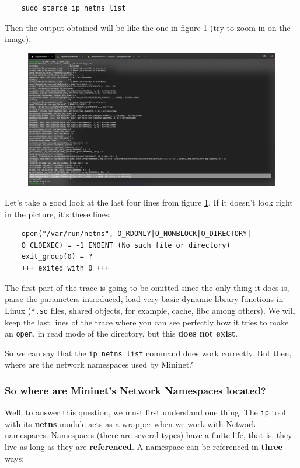 \documentclass[12pt]{article}
\newcommand{\newpar} {
    \vskip 1cm
}
\begin{document}
			\begin{verbatim}
	sudo starce ip netns list
			\end{verbatim}

			Then the output obtained will be like the one in figure \ref{f:sys_trace} (try to zoom in on the image).

			\begin{figure}[!htb]
				\centering
				\includegraphics[width=\linewidth]{sys_trace.jpg}
				\label{f:sys_trace}
			\end{figure}

			Let's take a good look at the last four lines from figure \ref{f:sys_trace}. If it doesn't look right in the picture, it's these lines:

			\begin{verbatim}
	open("/var/run/netns", O_RDONLY|O_NONBLOCK|O_DIRECTORY|
	O_CLOEXEC) = -1 ENOENT (No such file or directory)
	exit_group(0) = ?
	+++ exited with 0 +++
			\end{verbatim}

			The first part of the trace is going to be omitted since the only thing it does is, parse the parameters introduced, load very basic dynamic library functions in Linux (\texttt{*.so} files, shared objects, for example, cache, libc among others). We will keep the last lines of the trace where you can see perfectly how it tries to make an \texttt{open}, in read mode of the directory, but this \textbf{does not exist}.
			\newpar
			So we can say that the \texttt{ip netns list} command does work correctly. But then, where are the network namespaces used by Mininet?

		\subsubsection{So where are Mininet's Network Namespaces located?}
			Well, to answer this question, we must first understand one thing. The \texttt{ip} tool with its \textbf{netns} module acts as a wrapper when we work with Network namespaces. Namespaces (there are several \href{http://man7.org/linux/man-pages/man7/network_namespaces.7.html}{types}) have a finite life, that is, they live as long as they are \textbf{referenced}. A namespace can be referenced in \textbf{three} ways:
\end{document}
